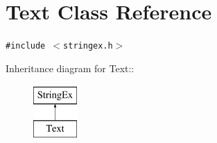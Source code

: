 \hypertarget{classText}{
\section{Text Class Reference}
\label{classText}
}
{\tt \#include $<$stringex.h$>$}

Inheritance diagram for Text::\begin{figure}[H]
\begin{center}
\leavevmode
\includegraphics[height=2cm]{classText}
\end{center}
\end{figure}
